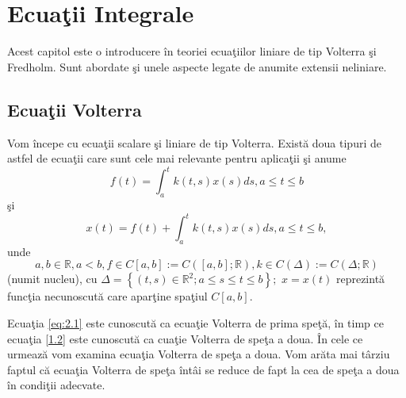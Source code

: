\documentclass[a4paper,12pt,oneside]{report}
\begin{document}
\chapter{Ecua\c{t}ii Integrale}
\nocite{micula}
\nocite{gmorosanu}

Acest capitol este o introducere \^{i}n teoriei ecua\c{t}iilor liniare de tip Volterra \c{s}i Fredholm. Sunt abordate \c{s}i unele aspecte legate de anumite extensii neliniare.


\section{Ecua\c{t}ii Volterra}

Vom \^{i}ncepe cu ecua\c{t}ii scalare \c{s}i liniare de tip Volterra. Exist\u{a} doua tipuri de astfel de ecua\c{t}ii care sunt cele mai relevante pentru aplica\c{t}ii \c{s}i anume
\begin{displaymath}
f\left ( t \right ) = \int_{a}^{t}k\left ( t,s \right )x\left ( s \right )ds,    a\leq t\leq b  \label{eq:2.1} \tag{2.1}
\end{displaymath}
\c{s}i
\begin{displaymath}
x\left ( t \right ) = f\left ( t \right ) + \int_{a}^{t}k\left ( t,s \right )x\left ( s \right )ds, a\leq t\leq b, \label{1.2} \tag{2.2}
\end{displaymath}
unde \[a,b \in \mathbb{R}, a< b, f\in C\left [ a,b \right ]:= C\left ( \left [ a,b \right ];\mathbb{R} \right ), k\in C\left (\Delta   \right ):= C\left ( \Delta ;\mathbb{R} \right )\] (numit nucleu), cu \(\Delta =\left \{ \left ( t,s \right )\in \mathbb{R}^{2};a\leq s\leq t\leq b \right \};\) \(x=x\left ( t \right )\) reprezint\u{a} func\c{t}ia necunoscut\u{a} care apar\c{t}ine spa\c{t}iul \(C\left [ a,b \right ]\).

\noindent Ecua\c{t}ia \ref{eq:2.1} este cunoscut\u{a} ca  ecua\c{t}ie Volterra de prima spe\c{t}\u{a}, \^{i}n timp ce ecua\c{t}ia \ref{1.2} este cunoscut\u{a} ca cua\c{t}ie Volterra de spe\c{t}a a doua. \^{I}n cele ce urmeaz\u{a} vom examina ecua\c{t}ia Volterra de spe\c{t}a a doua. Vom ar\u{a}ta mai t\^{a}rziu faptul c\u{a} ecua\c{t}ia Volterra de spe\c{t}a \^{i}nt\^{a}i se reduce de fapt la cea de spe\c{t}a a doua \^{i}n condi\c{t}ii adecvate.
\end{document}
